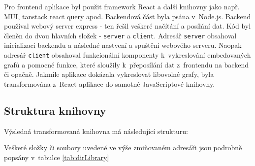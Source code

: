 \documentclass[czech, bc, kiv, he, iso690numb]{fasthesis}
\begin{document}
Pro frontend aplikace byl použit framework React a další knihovny jako např. MUI, tanstack react query apod. Backendová část byla psána v~Node.js. Backend používal webový server express - ten
řešil veškeré načítání a posílání dat. Kód byl členěn do dvou hlavních složek - \texttt{server} a \texttt{client}. Adresář \texttt{server} obsahoval inicializaci backendu a následné nastvení a spuštění webového serveru. Naopak
adresář \texttt{client} obsahoval funkcionální komponenty k~vykreslování embedovaných grafů a pomocné funkce, které sloužily k~přeposílání dat z~frontendu na backend či opačně. Jakmile aplikace
dokázala vykreslovat libovolné grafy, byla transformována z~React aplikace do samotné JavaScriptové knihovny.

\subsection{Struktura knihovny}

Výsledná transformovaná knihovna má následující strukturu:


Veškeré složky či soubory uvedené ve výše zmiňovaném adresáři jsou podrobně popsány v~tabulce \ref{tab:dirLibrary}
\end{document}
